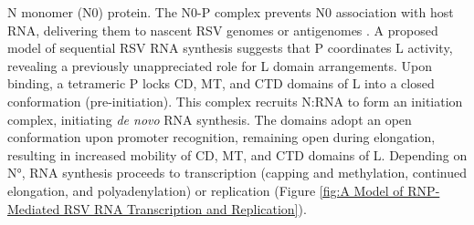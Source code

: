 N monomer (N0) protein. The N0-P complex prevents N0 association with host RNA, delivering them to nascent RSV genomes or antigenomes \cite{Castagne2004BiochemicalDomain, Galloux2015IdentificationNucleoprotein}. A proposed model of sequential RSV RNA synthesis suggests that P coordinates L activity, revealing a previously unappreciated role for L domain arrangements. Upon binding, a tetrameric P locks CD, MT, and CTD domains of L into a closed conformation (pre-initiation). This complex recruits N:RNA to form an initiation complex, initiating \textit{de novo} RNA synthesis. The domains adopt an open conformation upon promoter recognition, remaining open during elongation, resulting in increased mobility of CD, MT, and CTD domains of L. Depending on N°, RNA synthesis proceeds to transcription (capping and methylation, continued elongation, and polyadenylation) or replication \cite{Cao2020Cryo-EMPolymerase} (Figure \ref{fig:A Model of RNP-Mediated RSV RNA Transcription and Replication}).

